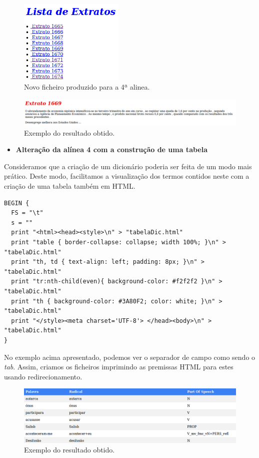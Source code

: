 \documentclass[a4paper]{article}
\begin{document}
\begin{figure}[h!]
  \includegraphics[width=50mm]{htmlExample.png} \centering
  \caption{Novo ficheiro produzido para a 4ª alinea.}
  \label{fig:htmlExample}
\end{figure}

\begin{figure}[h!]
  \includegraphics[width=150mm]{htmlExample2.png} \centering
  \caption{Exemplo do resultado obtido.}
  \label{fig:htmlExample2}
\end{figure}

\newpage

 \begin{itemize}
	\item \textbf{Alteração da alínea 4 com a construção de uma tabela} 
\end{itemize}
Consideramos que a criação de um dicionário poderia ser feita de um modo mais prático. Deste modo, facilitamos a visualização dos termos contidos neste com a criação de uma tabela também em HTML.

\begin{verbatim} 
BEGIN {
  FS = "\t"
  s = ""
  print "<html><head><style>\n" > "tabelaDic.html"
  print "table { border-collapse: collapse; width 100%; }\n" > "tabelaDic.html"
  print "th, td { text-align: left; padding: 8px; }\n" > "tabelaDic.html"
  print "tr:nth-child(even){ background-color: #f2f2f2 }\n" > "tabelaDic.html"
  print "th { background-color: #3A80F2; color: white; }\n" > "tabelaDic.html"
  print "</style><meta charset='UTF-8'> </head><body>\n" > "tabelaDic.html"
}
\end{verbatim}

No exemplo acima apresentado, podemos ver o separador de campo como sendo o \textit{tab}. Assim, criamos os ficheiros imprimindo as premissas HTML para estes usando redirecionamento.

\begin{figure}[h!]
  \includegraphics[width=170mm]{exemploTabela.png} \centering
  \caption{Exemplo do resultado obtido.}
  \label{fig:exemploTabela}
\end{figure}
\end{document}
